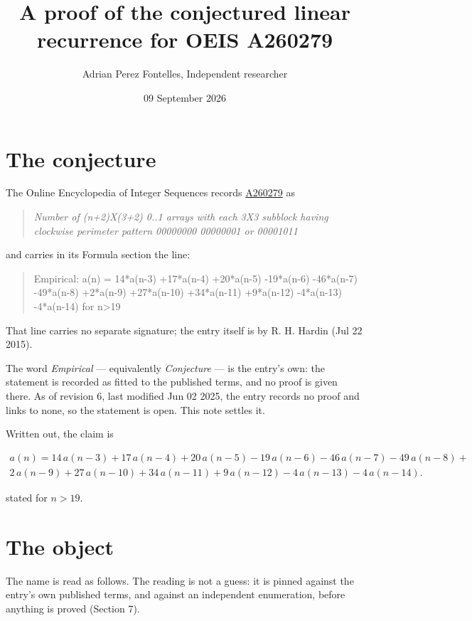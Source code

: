 \documentclass[11pt]{article}
\title{A proof of the conjectured linear recurrence for OEIS A260279}
\author{Adrian Perez Fontelles, Independent researcher}
\date{09 September 2026}
\theoremstyle{definition}
\begin{document}
\maketitle
\section{The conjecture}

The Online Encyclopedia of Integer Sequences records \href{https://oeis.org/A260279}{A260279} as

\begin{quote}\itshape Number of (n+2)X(3+2) 0..1 arrays with each 3X3 subblock having clockwise perimeter pattern 00000000 00000001 or 00001011\end{quote}

and carries in its Formula section the line:

\begin{quote}\ttfamily Empirical: a(n) = 14*a(n-3) +17*a(n-4) +20*a(n-5) -19*a(n-6) -46*a(n-7) -49*a(n-8) +2*a(n-9) +27*a(n-10) +34*a(n-11) +9*a(n-12) -4*a(n-13) -4*a(n-14) for n>19\end{quote}

That line carries no separate signature; the entry itself is by R. H. Hardin (Jul 22 2015).

The word {\itshape Empirical} --- equivalently {\itshape Conjecture} --- is the entry's own: the statement is recorded as fitted to the published terms, and no proof is given there. As of revision 6, last modified Jun 02 2025, the entry records no proof and links to none, so the statement is open. This note settles it.

Written out, the claim is

\begin{multline*} a(n) = 14\,a(n-3) + 17\,a(n-4) + 20\,a(n-5) - 19\,a(n-6) - 46\,a(n-7) - 49\,a(n-8) + \\ 2\,a(n-9) + 27\,a(n-10) + 34\,a(n-11) + 9\,a(n-12) - 4\,a(n-13) - 4\,a(n-14). \end{multline*}

stated for $n > 19$.

\section{The object}

The name is read as follows. The reading is not a guess: it is pinned against the entry's own published terms, and against an independent enumeration, before anything is proved (Section 7).
\end{document}
